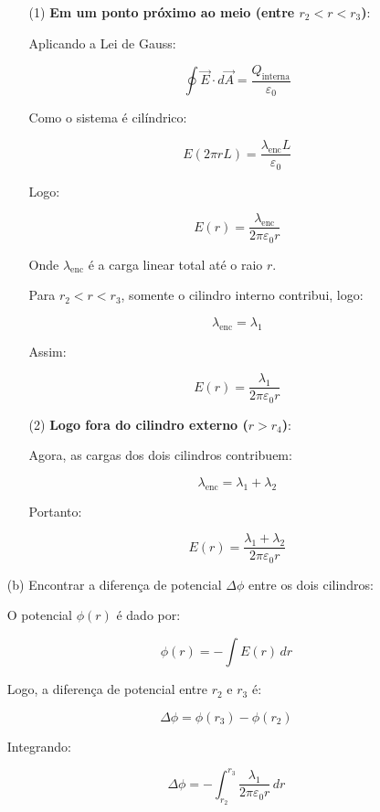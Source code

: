 \documentclass[a4paper,12pt]{article}
\begin{document}
\begin{flushleft}
\begin{itemize}
    \begin{itemize}
        \item[(1)] \textbf{Em um ponto próximo ao meio (entre $r_2 < r < r_3$)}:

        Aplicando a Lei de Gauss:

        \[
        \oint \vec{E} \cdot d\vec{A} = \frac{Q_{\text{interna}}}{\varepsilon_0}
        \]

        Como o sistema é cilíndrico:

        \[
        E(2\pi r L) = \frac{\lambda_{\text{enc}} L}{\varepsilon_0}
        \]
        
        Logo:

        \[
        E(r) = \frac{\lambda_{\text{enc}}}{2\pi\varepsilon_0 r}
        \]

        Onde $\lambda_{\text{enc}}$ é a carga linear total até o raio $r$.

        Para $r_2 < r < r_3$, somente o cilindro interno contribui, logo:

        \[
        \lambda_{\text{enc}} = \lambda_1
        \]

        Assim:

        \[
        E(r) = \frac{\lambda_1}{2\pi\varepsilon_0 r}
        \]

        \item[(2)] \textbf{Logo fora do cilindro externo ($r > r_4$)}:

        Agora, as cargas dos dois cilindros contribuem:

        \[
        \lambda_{\text{enc}} = \lambda_1 + \lambda_2
        \]

        Portanto:

        \[
        E(r) = \frac{\lambda_1 + \lambda_2}{2\pi\varepsilon_0 r}
        \]
    \end{itemize}

    \item[(b)] Encontrar a diferença de potencial $\Delta\phi$ entre os dois cilindros:

    O potencial $\phi(r)$ é dado por:

    \[
    \phi(r) = -\int E(r) \, dr
    \]

    Logo, a diferença de potencial entre $r_2$ e $r_3$ é:

    \[
    \Delta \phi = \phi(r_3) - \phi(r_2)
    \]

    Integrando:

    \[
    \Delta \phi = -\int_{r_2}^{r_3} \frac{\lambda_1}{2\pi\varepsilon_0 r} \, dr
    \]


\end{itemize}
\end{flushleft}
\end{document}

